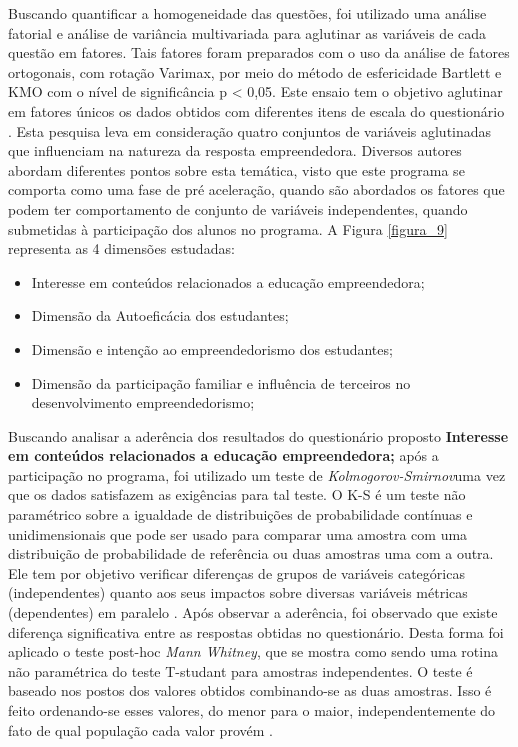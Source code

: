 Buscando quantificar a homogeneidade das questões, foi utilizado uma análise fatorial e análise de variância multivariada para aglutinar as variáveis de cada questão em fatores. Tais fatores foram preparados com o uso da análise de fatores ortogonais, com rotação Varimax, por meio do método de esfericidade Bartlett e KMO com o nível de significância p < 0,05. Este ensaio tem o objetivo aglutinar em fatores únicos os dados obtidos com diferentes itens de escala do questionário \cite{hair_multivariate_2006}. Esta pesquisa leva em consideração quatro conjuntos de variáveis aglutinadas que influenciam na natureza da resposta empreendedora. Diversos autores abordam diferentes pontos sobre esta temática, visto que este programa se comporta como uma fase de pré aceleração, quando são abordados os fatores que podem ter comportamento de conjunto de variáveis independentes, quando submetidas à participação dos alunos no programa. A Figura \ref{figura_9} representa as 4 dimensões estudadas:


\begin{itemize}
\item {Interesse em conteúdos relacionados a educação empreendedora;}
\item {Dimensão da Autoeficácia dos estudantes;}
\item {Dimensão e intenção  ao empreendedorismo dos estudantes;}
\item {Dimensão da participação familiar e influência de terceiros no desenvolvimento empreendedorismo;}
\end{itemize}

Buscando analisar a aderência dos resultados do questionário proposto \textbf{Interesse em conteúdos relacionados a educação empreendedora;} após a participação no programa, foi utilizado um teste de \textit{Kolmogorov-Smirnov}uma vez que os dados satisfazem as exigências para tal teste. O K-S é um teste não paramétrico sobre a igualdade de distribuições de probabilidade contínuas e unidimensionais que pode ser usado para comparar uma amostra com uma distribuição de probabilidade de referência ou duas amostras uma com a outra. Ele tem por objetivo verificar diferenças de grupos de variáveis categóricas (independentes) quanto aos seus impactos sobre diversas variáveis métricas (dependentes) em paralelo \cite{hair_alise_2009}. Após observar a aderência, foi observado que existe diferença significativa entre as respostas obtidas no questionário. Desta forma foi aplicado o teste post-hoc \textit{Mann Whitney}, que se mostra como sendo uma rotina não paramétrica do teste T-studant para amostras independentes. O teste  é baseado nos postos dos valores obtidos combinando-se as duas amostras. Isso é feito ordenando-se esses valores, do menor para o maior, independentemente do fato de qual população cada valor provém \cite{matsouaka_optimal_2018}.

